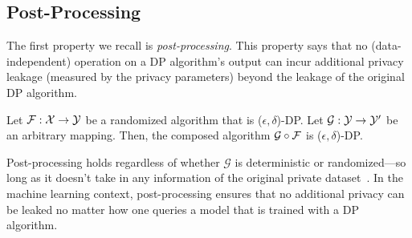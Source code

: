 \subsection{Post-Processing}
The first property we recall is \emph{post-processing}.
This property says that no (data-independent) operation on a DP algorithm's output can incur additional privacy leakage (measured by the privacy parameters) beyond the leakage of the original DP algorithm.
\begin{prop}
Let $\mathcal{F}: \mathcal{X} \to \mathcal{Y}$ be a randomized algorithm that is ($\epsilon, \delta$)-DP.
Let $\mathcal{G}: \mathcal{Y} \to \mathcal{Y}'$ be an arbitrary mapping. 
Then, the composed algorithm $\mathcal{G} \circ \mathcal{F}$ is ($\epsilon, \delta$)-DP.
\end{prop}
Post-processing holds regardless of whether $\mathcal{G}$ is deterministic or randomized---so long as it doesn't take in any information of the original private dataset~\cite{dwork2014algorithmic}.
In the machine learning context, post-processing ensures that no additional privacy can be leaked no matter how one queries a model that is trained with a DP algorithm.


